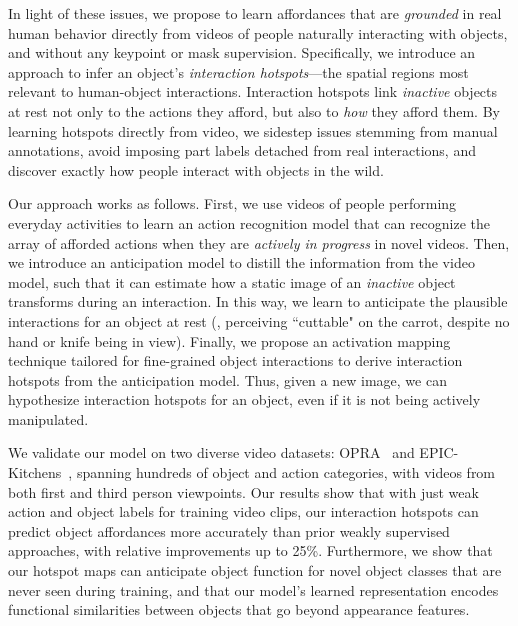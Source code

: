 \documentclass[10pt,twocolumn,letterpaper]{article}
\begin{document}
In light of these issues, we propose to learn affordances that are \emph{grounded} in real human behavior directly from videos of people naturally interacting with objects, and without any keypoint or mask supervision.
Specifically, we introduce an approach to infer an object's \emph{interaction hotspots}---the spatial regions most relevant to human-object interactions. Interaction hotspots link \emph{inactive} objects at rest not only to the actions they afford, but also to \emph{how} they afford them.
By learning hotspots directly from video, we sidestep issues stemming from manual annotations, avoid imposing part labels detached from real interactions, and discover exactly how people interact with objects in the wild.


Our approach works as follows. First, we use videos of people performing everyday activities to learn an action recognition model that can recognize the array of afforded actions when they are \emph{actively in progress} in novel videos.
Then, we introduce an anticipation model to distill the information from the video model, such that it can estimate how a static image of an \emph{inactive} object transforms during an interaction.  In this way, we learn to anticipate the plausible interactions for an object at rest (\eg, perceiving ``cuttable" on the carrot, despite no hand or knife being in view).
Finally, we propose an activation mapping technique tailored for fine-grained object interactions to derive interaction hotspots from the anticipation model.
Thus, given a new image, we can hypothesize interaction hotspots for an object, even if it is not being actively manipulated.


We validate our model on two diverse video datasets: OPRA~\cite{fang2018demo2vec} and EPIC-Kitchens~\cite{damen2018scaling}, spanning hundreds of object and action categories, with videos from both first and third person viewpoints. Our results show that with just weak action and object labels for training video clips, our interaction hotspots can predict object affordances more accurately than prior weakly supervised approaches, with relative improvements up to 25\%. 
Furthermore, we show that our hotspot maps can anticipate object function for novel object classes that are never seen during training, and that our model's learned representation encodes functional similarities between objects that go beyond appearance features.
\end{document}
